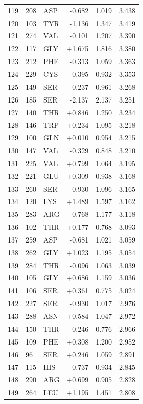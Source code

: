 \begin{longtable}{r l l r r r}
119 & 208 & ASP & -0.682 & 1.019 & 3.438 \\
120 & 103 & TYR & -1.136 & 1.347 & 3.419 \\
121 & 274 & VAL & -0.101 & 1.207 & 3.390 \\
122 & 117 & GLY & +1.675 & 1.816 & 3.380 \\
123 & 212 & PHE & -0.313 & 1.059 & 3.363 \\
124 & 229 & CYS & -0.395 & 0.932 & 3.353 \\
125 & 149 & SER & -0.237 & 0.961 & 3.268 \\
126 & 185 & SER & -2.137 & 2.137 & 3.251 \\
127 & 140 & THR & +0.846 & 1.250 & 3.234 \\
128 & 146 & TRP & +0.234 & 1.095 & 3.218 \\
129 & 100 & GLN & +0.010 & 0.954 & 3.215 \\
130 & 147 & VAL & -0.329 & 0.848 & 3.210 \\
131 & 225 & VAL & +0.799 & 1.064 & 3.195 \\
132 & 221 & GLU & +0.309 & 0.938 & 3.168 \\
133 & 260 & SER & -0.930 & 1.096 & 3.165 \\
134 & 120 & LYS & +1.489 & 1.597 & 3.162 \\
135 & 283 & ARG & -0.768 & 1.177 & 3.118 \\
136 & 102 & THR & +0.177 & 0.768 & 3.093 \\
137 & 259 & ASP & -0.681 & 1.021 & 3.059 \\
138 & 262 & GLY & +1.023 & 1.195 & 3.054 \\
139 & 284 & THR & -0.096 & 1.063 & 3.039 \\
140 & 105 & GLY & +0.686 & 1.159 & 3.036 \\
141 & 106 & SER & +0.361 & 0.775 & 3.024 \\
142 & 227 & SER & -0.930 & 1.017 & 2.976 \\
143 & 288 & ASN & +0.584 & 1.047 & 2.972 \\
144 & 150 & THR & -0.246 & 0.776 & 2.966 \\
145 & 109 & PHE & +0.308 & 1.200 & 2.952 \\
146 & 96 & SER & +0.246 & 1.059 & 2.891 \\
147 & 115 & HIS & -0.737 & 0.934 & 2.845 \\
148 & 290 & ARG & +0.699 & 0.905 & 2.828 \\
149 & 264 & LEU & +1.195 & 1.451 & 2.808 \\

\end{longtable}
